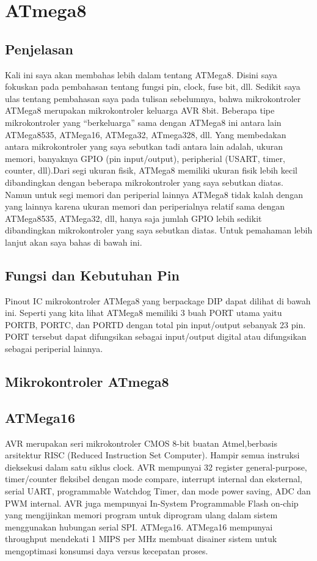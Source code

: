 \section{ATmega8}

	\subsection{Penjelasan}
		Kali ini saya akan membahas lebih dalam tentang ATMega8. Disini saya fokuskan pada pembahasan tentang fungsi pin, clock, fuse bit, dll.
		Sedikit saya ulas tentang pembahasan saya pada tulisan sebelumnya, bahwa mikrokontroler ATMega8 merupakan mikrokontroler keluarga AVR 8bit. Beberapa tipe mikrokontroler yang “berkeluarga” sama dengan ATMega8 ini antara lain ATMega8535, ATMega16, ATMega32, ATmega328, dll. Yang membedakan antara mikrokontroler yang saya sebutkan tadi antara lain adalah, ukuran memori, banyaknya GPIO (pin input/output), peripherial (USART, timer, counter, dll).Dari segi ukuran fisik, ATMega8 memiliki ukuran fisik lebih kecil dibandingkan dengan beberapa mikrokontroler yang saya sebutkan diatas. Namun untuk segi memori dan periperial lainnya ATMega8 tidak kalah dengan yang lainnya karena ukuran memori dan periperialnya relatif sama dengan ATMega8535, ATMega32, dll, hanya saja jumlah GPIO lebih sedikit dibandingkan mikrokontroler yang saya sebutkan diatas. Untuk pemahaman lebih lanjut akan saya bahas di bawah ini.
	
	\subsection{Fungsi dan Kebutuhan Pin}
		Pinout IC mikrokontroler ATMega8 yang berpackage DIP dapat dilihat di bawah ini.
		Seperti yang kita lihat ATMega8 memiliki 3 buah PORT utama yaitu PORTB, PORTC, dan PORTD dengan total pin input/output sebanyak 23 pin. PORT tersebut dapat difungsikan sebagai input/output digital atau difungsikan sebagai periperial lainnya.
		
	\subsection{Mikrokontroler ATmega8}
		
	\subsection{ATMega16}
		AVR merupakan seri mikrokontroler CMOS 8-bit buatan Atmel,berbasis arsitektur RISC (Reduced Instruction Set Computer). Hampir semua instruksi dieksekusi dalam satu siklus clock. AVR mempunyai 32 register general-purpose, timer/counter fleksibel dengan mode compare, interrupt internal dan eksternal, serial UART, programmable Watchdog Timer, dan mode power saving, ADC dan PWM internal. AVR juga mempunyai In-System Programmable Flash on-chip yang mengijinkan memori program untuk diprogram ulang dalam sistem menggunakan hubungan serial SPI. ATMega16. ATMega16 mempunyai throughput mendekati 1 MIPS per MHz membuat disainer sistem untuk mengoptimasi konsumsi daya versus kecepatan proses.


